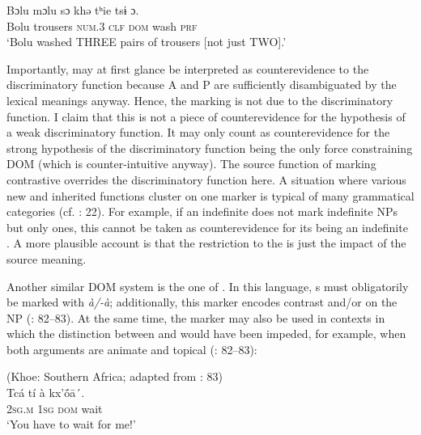 \documentclass[output=paper]{langsci/langscibook}
\begin{document}
\ex\label{ex:serzant:27b}
\gll  Bɔlu   mɔlu     sɔ   khǝ   tʰie   tsɨ   ɔ.\\
     Bolu  trousers  \textsc{num.}3  \textsc{clf}  \textsc{dom}   wash   \textsc{prf}\\
\glt ‘Bolu washed THREE pairs of trousers [not just TWO].’
\z
\z

Importantly,  may at first glance be interpreted as counterevidence to the discriminatory function because A and P are sufficiently disambiguated by the lexical meanings anyway. Hence, the marking is not due to the discriminatory function. I claim that this is not a piece of counterevidence for the hypothesis of a weak discriminatory function. It may only count as counterevidence for the strong hypothesis of the discriminatory function being the only force constraining DOM (which is counter-intuitive anyway). The source function of marking contrastive  overrides the discriminatory function here. A situation where various new and inherited functions cluster on one marker is typical of many grammatical categories (cf. \citealt{Hopper1991}: 22). For example, if an indefinite  does not mark  indefinite NPs but only  ones, this cannot be taken as counterevidence for its being an indefinite . A more plausible account is that the restriction to the  is just the impact of the source meaning. 

Another similar DOM system is the one of . In this language, s must obligatorily be marked with \textit{à/-à}; additionally, this marker encodes contrast and/or  on the NP (\citealt{KilianHatz2006}: 82–83). At the same time, the marker may also be used in contexts in which the distinction between  and  would have been impeded, for example, when both arguments are animate and topical (\citealt{KilianHatz2006}: 82–83):

\ea 
{} (Khoe: Southern Africa; adapted from \citealt{KilianHatz2006}: 83)\\
\ea
\gll  Tcá   tí   à   kx’ṓā´.\\
     \textsc{2sg.m}   \textsc{1sg}   \textsc{dom}  wait\\
\glt ‘You have to wait for me!’
\end{document}
